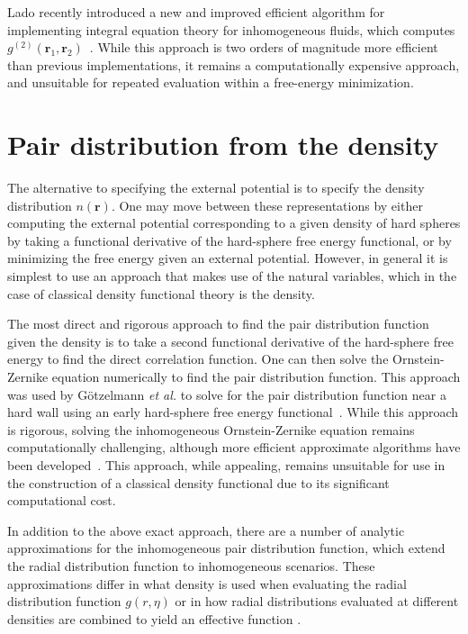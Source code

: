 \documentclass[letterpaper,twocolumn,amsmath,amssymb,pre,aps,10pt]{revtex4-1}
\newcommand{\rr}{\textbf{r}}
\begin{document}
Lado recently introduced a new and improved efficient algorithm for
implementing integral equation theory for inhomogeneous fluids, which
computes $g^{(2)}(\rr_1,\rr_2)$~\cite{lado2009efficient}.  While this
approach is two orders of magnitude more efficient than previous
implementations, it remains a computationally expensive approach, and
unsuitable for repeated evaluation within a free-energy minimization.

\section{Pair distribution from the density}\label{sec:gn}

The alternative to specifying the external potential is to specify the
density distribution $n(\rr)$.  One may move between these
representations by either computing the external potential
corresponding to a given density of hard spheres by taking a
functional derivative of the hard-sphere free energy functional, or by
minimizing the free energy given an external potential.  However, in
general it is simplest to use an approach that makes use of the
natural variables, which in the case of classical density functional
theory is the density.

The most direct and rigorous approach to find the pair distribution
function given the density is to take a second functional derivative
of the hard-sphere free energy to find the direct correlation
function.  One can then solve the Ornstein-Zernike equation
numerically to find the pair distribution function.  This approach was
used by G{\"o}tzelmann \emph{et al.} to solve for the pair
distribution function near a hard wall using an early hard-sphere free
energy functional~\cite{gotzelmann1996structure}.  While this approach
is rigorous, solving the inhomogeneous Ornstein-Zernike equation
remains computationally challenging, although more efficient
approximate algorithms have been developed~\cite{paul2003variational}.
This approach, while appealing, remains unsuitable for use in the
construction of a classical density functional due to its significant
computational cost.

In addition to the above exact approach, there are a number of
analytic approximations for the inhomogeneous pair distribution
function, which extend the radial distribution function to
inhomogeneous scenarios.  These approximations differ in what density
is used when evaluating the radial distribution function $g(r,\eta)$
or in how radial distributions evaluated at different densities are
combined to yield an effective function
\cite{toxvaerd1973statistical}.
\end{document}
